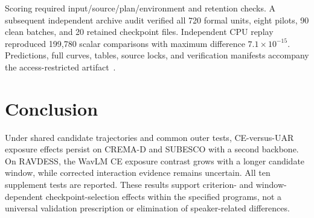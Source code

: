 \documentclass[letterpaper]{article}
\begin{document}
Scoring required input/source/plan/environment and retention checks. A subsequent independent archive audit verified all 720 formal units, eight pilots, 90 clean batches, and 20 retained checkpoint files. Independent CPU replay reproduced 199,780 scalar comparisons with maximum difference $7.1\times10^{-15}$. Predictions, full curves, tables, source locks, and verification manifests accompany the access-restricted artifact~\cite{artifact}.

\section{Conclusion}
Under shared candidate trajectories and common outer tests, CE-versus-UAR exposure effects persist on CREMA-D and SUBESCO with a second backbone. On RAVDESS, the WavLM CE exposure contrast grows with a longer candidate window, while corrected interaction evidence remains uncertain. All ten supplement tests are reported. These results support criterion- and window-dependent checkpoint-selection effects within the specified programs, not a universal validation prescription or elimination of speaker-related differences.
\end{document}
